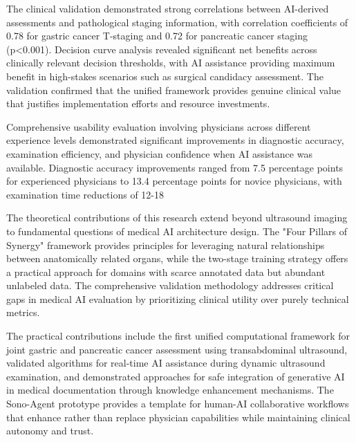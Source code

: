 The clinical validation demonstrated strong correlations between AI-derived assessments and pathological staging information, with correlation coefficients of 0.78 for gastric cancer T-staging and 0.72 for pancreatic cancer staging (p<0.001). Decision curve analysis revealed significant net benefits across clinically relevant decision thresholds, with AI assistance providing maximum benefit in high-stakes scenarios such as surgical candidacy assessment. The validation confirmed that the unified framework provides genuine clinical value that justifies implementation efforts and resource investments.

Comprehensive usability evaluation involving physicians across different experience levels demonstrated significant improvements in diagnostic accuracy, examination efficiency, and physician confidence when AI assistance was available. Diagnostic accuracy improvements ranged from 7.5 percentage points for experienced physicians to 13.4 percentage points for novice physicians, with examination time reductions of 12-18%

The theoretical contributions of this research extend beyond ultrasound imaging to fundamental questions of medical AI architecture design. The "Four Pillars of Synergy" framework provides principles for leveraging natural relationships between anatomically related organs, while the two-stage training strategy offers a practical approach for domains with scarce annotated data but abundant unlabeled data. The comprehensive validation methodology addresses critical gaps in medical AI evaluation by prioritizing clinical utility over purely technical metrics.

The practical contributions include the first unified computational framework for joint gastric and pancreatic cancer assessment using transabdominal ultrasound, validated algorithms for real-time AI assistance during dynamic ultrasound examination, and demonstrated approaches for safe integration of generative AI in medical documentation through knowledge enhancement mechanisms. The Sono-Agent prototype provides a template for human-AI collaborative workflows that enhance rather than replace physician capabilities while maintaining clinical autonomy and trust.

